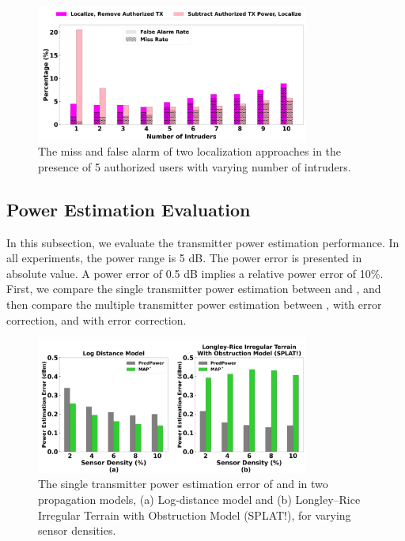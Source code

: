 \begin{figure}[t]
    \centering
    \includegraphics[width=0.8\textwidth]{chapters/wowmom-pmc/figures/splat-missfalse-authorized-varyintru.png}
    \caption{The miss and false alarm of two localization approaches in the presence of 5 authorized users with varying number of intruders.}
    \label{fig:authorized_missfalse}
\end{figure}




\subsection{Power Estimation Evaluation}
\label{subsec:powereval}
In this subsection, we evaluate the transmitter power estimation performance.
In all experiments, the power range is 5 dB.
The power error is presented in absolute value.
A power error of 0.5 dB implies a relative power error of 10\%.
First, we compare the single transmitter power estimation between \map and \power, and then compare the multiple transmitter power estimation between \map, \power with error correction, and \power with error correction.

\begin{figure}
    \centering
    \includegraphics[width=0.8\textwidth]{chapters/wowmom-pmc/figures/powererror_varysensor.png}
    \caption{The single transmitter power estimation error of \power and \map in two propagation models, (a) Log-distance model and (b) Longley--Rice Irregular Terrain with Obstruction Model (SPLAT!), for varying sensor densities.}
    \label{fig:singleTXpower}
\end{figure}

